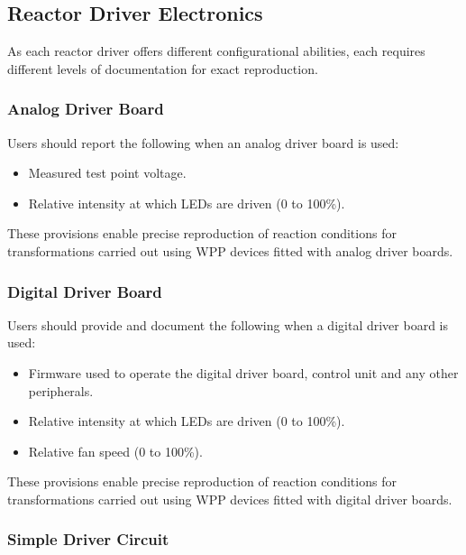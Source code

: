 \documentclass[11pt]{article}
\begin{document}
\subsection{Reactor Driver Electronics} \label{SEC:doc-reactor-drivers}

As each reactor driver offers different configurational abilities, each requires different levels of documentation for exact reproduction.

\subsubsection{Analog Driver Board } \label{SEC:doc-analog-driver}

Users should report the following when an analog driver board is used:

\begin{itemize}
	\item Measured test point voltage.
	\item Relative intensity at which LEDs are driven (0 to 100\%).
\end{itemize}

These provisions enable precise reproduction of reaction conditions for transformations carried out using WPP devices fitted with analog driver boards.

\subsubsection{Digital Driver Board} \label{SEC:doc-digital-driver}

Users should provide and document the following when a digital driver board is used:

\begin{itemize}
	\item Firmware used to operate the digital driver board, control unit and any other peripherals.
	\item Relative intensity at which LEDs are driven (0 to 100\%).
	\item Relative fan speed (0 to 100\%).
\end{itemize}

These provisions enable precise reproduction of reaction conditions for transformations carried out using WPP devices fitted with digital driver boards.

\subsubsection{Simple Driver Circuit} \label{SEC:doc-simple-driver}
\end{document}
